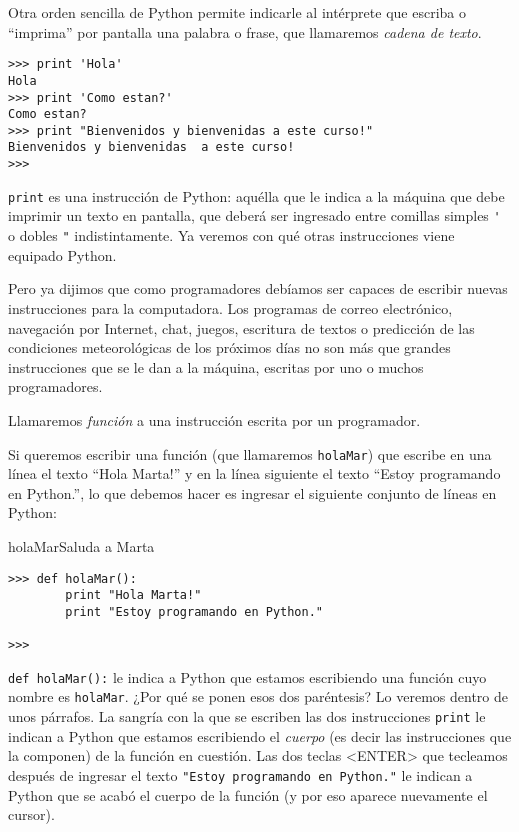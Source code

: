 Otra orden sencilla de Python permite indicarle al intérprete que escriba o
``imprima'' por pantalla una palabra o frase, que llamaremos {\it cadena de
texto}.

\begin{lstlisting}[numbers=none]
>>> print 'Hola'
Hola
>>> print 'Como estan?'
Como estan?
>>> print "Bienvenidos y bienvenidas a este curso!"
Bienvenidos y bienvenidas  a este curso!
>>>
\end{lstlisting}

\lstinline+print+ es una instrucción de Python: aquélla que le indica a la
máquina que debe imprimir un texto en pantalla, que deberá ser ingresado entre
comillas simples \lstinline!'! o dobles \lstinline!"! indistintamente. Ya
veremos con qué otras instrucciones viene equipado Python.

Pero ya dijimos que como programadores debíamos ser capaces de
escribir nuevas instrucciones para la computadora. Los programas
de correo electrónico, navegación por Internet, chat, juegos,
escritura de textos o predicción de las condiciones meteorológicas de los
próximos días no son más que grandes instrucciones que se le dan a la
máquina, escritas por uno o muchos programadores.

Llamaremos {\it función} a una instrucción escrita por un
programador.

Si queremos escribir una función (que llamaremos \lstinline!holaMar!)
que escribe en una línea el texto ``Hola Marta!'' y en la línea
siguiente el texto ``Estoy programando en Python.'', lo que
debemos hacer es ingresar el siguiente conjunto de líneas en
Python:

\begin{codigo}{holaMar}{Saluda a Marta}
\begin{lstlisting}[numbers=none]
>>> def holaMar():
        print "Hola Marta!"
        print "Estoy programando en Python."

>>>
\end{lstlisting}
\end{codigo}

\lstinline!def holaMar():! le indica a Python que estamos escribiendo
una función cuyo nombre es \lstinline!holaMar!. ¿Por qué se ponen
esos dos paréntesis? Lo veremos dentro de unos párrafos. La
sangría con la que se escriben las dos instrucciones \lstinline+print+
le indican a Python que estamos escribiendo el {\it cuerpo} (es
decir las instrucciones que la componen) de la función en
cuestión. Las dos teclas <ENTER> \esp que tecleamos después de
ingresar el texto \lstinline+"Estoy programando en Python."+ le indican
a Python que se acabó el cuerpo de la función (y por eso aparece
nuevamente el cursor).


